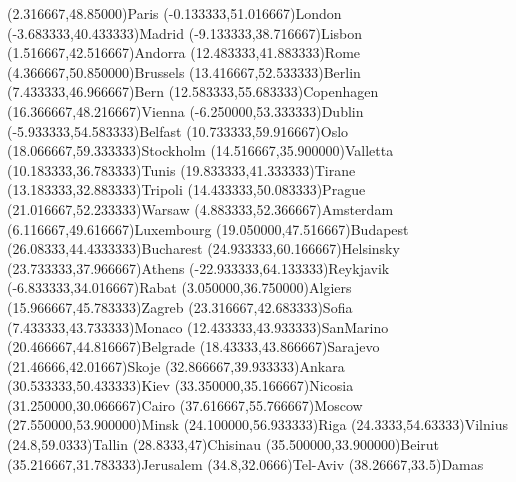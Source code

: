 \mapputIIID[90](2.316667,48.85000){Paris}
\mapputIIID[90](-0.133333,51.016667){London}
\mapputIIID[90](-3.683333,40.433333){Madrid}
\mapputIIID[90](-9.133333,38.716667){Lisbon}
\mapputIIID[90](1.516667,42.516667){Andorra}
\mapputIIID[90](12.483333,41.883333){Rome}
\mapputIIID[40](4.366667,50.850000){Brussels}
\mapputIIID[90](13.416667,52.533333){Berlin}
\mapputIIID[90](7.433333,46.966667){Bern}
\mapputIIID[0](12.583333,55.683333){Copenhagen}
\mapputIIID[90](16.366667,48.216667){Vienna}
\mapputIIID[90](-6.250000,53.333333){Dublin}
\mapputIIID[90](-5.933333,54.583333){Belfast}
\mapputIIID[90](10.733333,59.916667){Oslo}
\mapputIIID[90](18.066667,59.333333){Stockholm}
\mapputIIID[90](14.516667,35.900000){Valletta}
\mapputIIID[90](10.183333,36.783333){Tunis}
\mapputIIID[90](19.833333,41.333333){Tirane}
\mapputIIID[90](13.183333,32.883333){Tripoli}
\mapputIIID[90](14.433333,50.083333){Prague}
\mapputIIID[90](21.016667,52.233333){Warsaw}
\mapputIIID[90](4.883333,52.366667){Amsterdam}
\mapputIIID[-60](6.116667,49.616667){Luxembourg}
\mapputIIID[0](19.050000,47.516667){Budapest}
\mapputIIID[90](26.08333,44.4333333){Bucharest}
\mapputIIID[90](24.933333,60.166667){Helsinsky}
\mapputIIID[90](23.733333,37.966667){Athens}
\mapputIIID[90](-22.933333,64.133333){Reykjavik}
\mapputIIID[90](-6.833333,34.016667){Rabat}
\mapputIIID[90](3.050000,36.750000){Algiers}
\mapputIIID[90](15.966667,45.783333){Zagreb}
\mapputIIID[90](23.316667,42.683333){Sofia}
\mapputIIID[90](7.433333,43.733333){Monaco}
\mapputIIID[90](12.433333,43.933333){SanMarino}
\mapputIIID[90](20.466667,44.816667){Belgrade}
\mapputIIID[90](18.43333,43.866667){Sarajevo}
\mapputIIID[90](21.46666,42.01667){Skoje}
\mapputIIID[90](32.866667,39.933333){Ankara}
\mapputIIID[90](30.533333,50.433333){Kiev}
\mapputIIID[90](33.350000,35.166667){Nicosia}
\mapputIIID[90](31.250000,30.066667){Cairo}
\mapputIIID[90](37.616667,55.766667){Moscow}
\mapputIIID[-90](27.550000,53.900000){Minsk}
\mapputIIID[90](24.100000,56.933333){Riga}
\mapputIIID[90](24.3333,54.63333){Vilnius}
\mapputIIID[90](24.8,59.0333){Tallin}
\mapputIIID[90](28.8333,47){Chisinau}
\mapputIIID[90](35.500000,33.900000){Beirut}
\mapputIIID[0](35.216667,31.783333){Jerusalem}
\mapputIIID[180](34.8,32.0666){Tel-Aviv}
\mapputIIID[90](38.26667,33.5){Damas}
